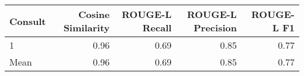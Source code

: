 \begin{tabular}{lrrrr}
\toprule
Consult & Cosine Similarity & ROUGE-L Recall & ROUGE-L Precision & ROUGE-L F1 \\
\midrule
1 & 0.96 & 0.69 & 0.85 & 0.77 \\
Mean & 0.96 & 0.69 & 0.85 & 0.77 \\
\bottomrule
\end{tabular}
